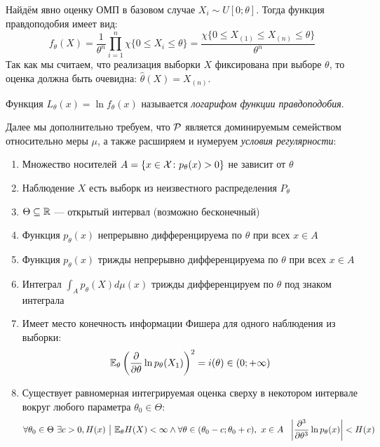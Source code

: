 \begin{example}
	Найдём явно оценку ОМП в базовом случае $X_i \sim U[0; \theta]$. Тогда функция правдоподобия имеет вид:
	\[
		f_\theta(X) = \frac{1}{\theta^n} \prod_{i = 1}^n \chi\{0 \le X_i \le \theta\} = \frac{\chi\{0 \le X_{(1)} \le X_{(n)} \le \theta\}}{\theta^n}
	\]
	Так как мы считаем, что реализация выборки $X$ фиксирована при выборе $\theta$, то оценка должна быть очевидна: $\hat{\theta}(X) = X_{(n)}$.
\end{example}

\begin{definition}
	Функция $L_\theta(x) = \ln f_\theta(x)$ называется \textit{логарифом функции правдоподобия}.
\end{definition}

\begin{note}
	Далее мы дополнительно требуем, что $\mathcal{P}$ является доминируемым семейством относительно меры $\mu$, а также расширяем и нумеруем \textit{условия регулярности}:
	\begin{enumerate}
		\item Множество носителей $A = \{x \in \mathcal{X} \colon p_\theta(x) > 0\}$ не зависит от $\theta$
		
		\item Наблюдение $X$ есть выборк из неизвестного распределения $P_\theta$
		
		\item $\Theta \subseteq \mathbb{R}$ --- открытый интервал (возможно бесконечный)
		
		\item Функция $p_\theta(x)$ непрерывно дифференцируема по $\theta$ при всех $x \in A$
		
		\item Функция $p_\theta(x)$ трижды непрерывно дифференцируема по $\theta$ при всех $x \in A$
		
		\item Интеграл $\int_A p_\theta(X)d\mu(x)$ трижды дифференцируем по $\theta$ под знаком интеграла
		
		\item Имеет место конечность информации Фишера для одного наблюдения из выборки:
		\[
			\mathbb{E}_\theta\left(\frac{\partial }{\partial \theta} \ln p_\theta(X_1)\right)^2 = i(\theta) \in (0; +\infty)
		\]
		
		\item Существует равномерная интегрируемая оценка сверху в некотором интервале вокруг любого параметра $\theta_0 \in \Theta$:
		\[
			\forall \theta_0 \in \Theta\ \exists c > 0, H(x) \ \big|\  \mathbb{E}_\theta H(X) < \infty \wedge \forall \theta \in (\theta_0 - c; \theta_0 + c),\ x \in A\ \ \left|\frac{\partial ^3}{\partial \theta^3} \ln p_\theta(x)\right| < H(x)
		\]
	\end{enumerate}
\end{note}